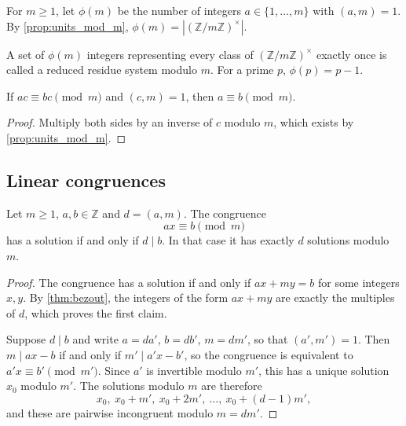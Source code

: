 \begin{definition}\label{def:euler_phi}
    For $m \ge 1$, let $\phi(m)$ be the number of integers $a \in \{1, \dots, m\}$ with $(a,m) = 1$. By \cref{prop:units_mod_m}, $\phi(m) = \left|(\mathbb{Z}/m\mathbb{Z})^\times\right|$.
\end{definition}
A set of $\phi(m)$ integers representing every class of $(\mathbb{Z}/m\mathbb{Z})^\times$ exactly once is called a reduced residue system modulo $m$. For a prime $p$, $\phi(p) = p - 1$.

\begin{corollary}[Cancellation]\label{cor:cancellation}
    If $ac \equiv bc \pmod m$ and $(c,m) = 1$, then $a \equiv b \pmod m$.
\end{corollary}
\begin{proof}
    Multiply both sides by an inverse of $c$ modulo $m$, which exists by \cref{prop:units_mod_m}.
\end{proof}

\subsection{Linear congruences}
\begin{theorem}\label{thm:linear_congruence}
    Let $m \ge 1$, $a, b \in \mathbb{Z}$ and $d = (a,m)$. The congruence
    \begin{equation*}
        ax \equiv b \pmod m
    \end{equation*}
    has a solution if and only if $d \mid b$. In that case it has exactly $d$ solutions modulo $m$.
\end{theorem}
\begin{proof}
    The congruence has a solution if and only if $ax + my = b$ for some integers $x,y$. By \cref{thm:bezout}, the integers of the form $ax + my$ are exactly the multiples of $d$, which proves the first claim.

    Suppose $d \mid b$ and write $a = da'$, $b = db'$, $m = dm'$, so that $(a',m') = 1$. Then $m \mid ax - b$ if and only if $m' \mid a'x - b'$, so the congruence is equivalent to $a'x \equiv b' \pmod{m'}$. Since $a'$ is invertible modulo $m'$, this has a unique solution $x_0$ modulo $m'$. The solutions modulo $m$ are therefore
    \begin{equation*}
        x_0,\ x_0 + m',\ x_0 + 2m',\ \dots,\ x_0 + (d-1)m',
    \end{equation*}
    and these are pairwise incongruent modulo $m = dm'$.
\end{proof}
